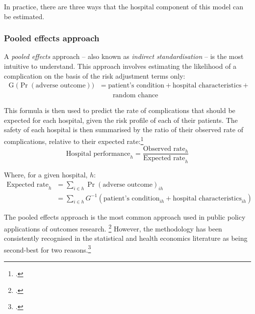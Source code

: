 \documentclass[submission]{grattan}
\begin{document}
In practice, there are three ways that the hospital component of this model can be estimated.

\subsubsection{Pooled effects approach}\label{subsubsec:pooled-effects-approach}

A \emph{pooled effects} approach -- also known as \emph{indirect standardisation} -- is the most intuitive to understand.
This approach involves estimating the likelihood of a complication on the basis of the risk adjustment terms only:
\begin{align*}
\operatorname{G}(\Pr{\left( \text{adverse\ outcome} \right))} & = \text{patient's condition} + \text{hospital characteristics} + {}\\
                                                              & \qquad\text{random chance}
\end{align*}

This formula is then used to predict the rate of complications that should be expected for each hospital, given the risk profile of each of their patients.
The safety of each hospital is then summarised by the ratio of their observed rate of complications, relative to their expected rate:\footcite{Iezzoni-2012-Risk-Adjustment-for-Measuring-Health-Care-Outcomes}
\[\text{Hospital performance}_{h} = \frac{\text{Observed rate}_{h}}{\text{Expected rate}_{h}}\]

Where, for a given hospital, \(h\):
\begin{align*}
\text{Expected rate}_{h} &= \sum_{i \in h}\Pr(\text{adverse outcome})_{{ih}}\\
&= \sum_{i \in h}G^{-1}(\text{patient's condition}_{ih} + \text{hospital characteristics}_{ih})
\end{align*}

The pooled effects approach is the most common approach used in public policy applications of outcomes research.%
  \footcite{Iezzoni-2012-Risk-Adjustment-for-Measuring-Health-Care-Outcomes}
However, the methodology has been consistently recognised in the statistical and health economics literature as being second-best for two reasons.\footcites{krumholz2006standards}{Ash-etal-2012-Stats-issues-assessing-hospital-perf}
\end{document}

